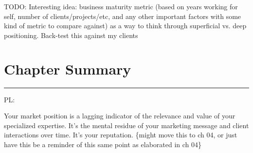 TODO: Interesting idea: business maturity metric (based on years working for self, number of clients/projects/etc, and any other important factors with some kind of metric to compare against) as a way to think through superficial vs. deep positioning. Back-test this against my clients

\section{Chapter Summary}

\begin{center}
\rule{3in}{0.4pt}
\end{center}

PL:

Your market position is a lagging indicator of the relevance and value of your specialized expertise. It's the mental residue of your marketing message and client interactions over time. It's your reputation. \{might move this to ch 04, or just have this be a reminder of this same point as elaborated in ch 04\}